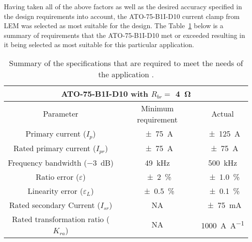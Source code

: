 Having taken all of the above factors as well as the desired accuracy specified in the design requirements into account, the ATO-75-B1I-D10 current clamp from LEM was selected as most suitable for the design. The Table~\ref{tab:CC_Summary} below is a summary of requirements that the ATO-75-B1I-D10 met or exceeded resulting in it being selected as most suitable for this particular application.

\begin{table}[H]
\small
\centering
\begin{tabular}{|ccc|}
\hline
\multicolumn{3}{|c|}{ATO-75-B1I-D10 with $R_{br} = $ \qty{4}{\ohm}}                 \\ \hline
\multicolumn{1}{|c|}{Parameter} & \multicolumn{1}{c|}{Minimum requirement} & Actual \\ \hline
\multicolumn{1}{|c|}{Primary current ($I_{p}$)}           & \multicolumn{1}{c|}{\qty{ \pm 75}{\ampere}}  & \qty{\pm 125}{\ampere}                              \\ \hline
\multicolumn{1}{|c|}{Rated primary current ($I_{pr}$)}    & \multicolumn{1}{c|}{\qty{ \pm 75}{\ampere}}  & \qty{\pm 75}{\ampere}                               \\ \hline
\multicolumn{1}{|c|}{Frequency bandwidth (\qty{-3}{\dB})} & \multicolumn{1}{c|}{\qty{49}{\kHz}}          & \qty{500}{\kHz}                                     \\ \hline
\multicolumn{1}{|c|}{Ratio error ($\varepsilon$)}         & \multicolumn{1}{c|}{\qty{\pm 2}{\percent}}   & \qty{\pm 1.0}{\percent}                             \\ \hline
\multicolumn{1}{|c|}{Linearity error ($\varepsilon_{L}$)}  & \multicolumn{1}{c|}{\qty{\pm 0.5}{\percent}} & \qty{\pm 0.1}{\percent}                             \\ \hline
\multicolumn{1}{|c|}{Rated secondary Current ($I_{sr}$)}  & \multicolumn{1}{c|}{NA}                      & \qty{\pm 75}{\mA}                                   \\ \hline
\multicolumn{1}{|c|}{Rated transformation ratio ($K_{ra}$)}          & \multicolumn{1}{c|}{NA}                      & \qty[per-mode = symbol]{1000}{\ampere \per \ampere} \\ \hline
\end{tabular}%
\caption{Summary of the specifications that are required to meet the needs of the application \cite{LEM:ATO-75-B1I-D10}.
}
\label{tab:CC_Summary}
\end{table}

